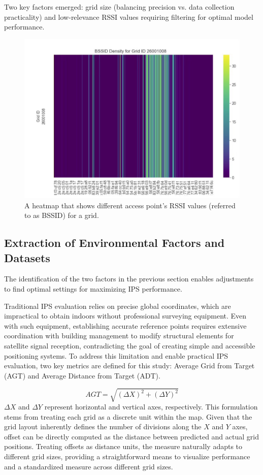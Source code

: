\documentclass[runningheads]{llncs}
\begin{document}
Two key factors emerged: grid size (balancing precision vs. data collection practicality) and low-relevance RSSI values requiring filtering for optimal model performance.

\begin{figure}[htbp]
	\centerline{\includegraphics[scale=0.15]{meth3.jpg}}
	\caption{A heatmap that shows different access point’s RSSI values (referred to as BSSID) for a grid.}
	\label{fig:heatmap008}
\end{figure}

\subsection{Extraction of Environmental Factors and Datasets}
The identification of the two factors in the previous section enables adjustments to find optimal settings for maximizing IPS performance. 

Traditional IPS evaluation relies on precise global coordinates, which are impractical to obtain indoors without professional surveying equipment. Even with such equipment, establishing accurate reference points requires extensive coordination with building management to modify structural elements for satellite signal reception, contradicting the goal of creating simple and accessible positioning systems. To address this limitation and enable practical IPS evaluation, two key metrics are defined for this study: Average Grid from Target (AGT) and Average Distance from Target (ADT).

\begin{equation}
	AGT = \sqrt{(\Delta X)^2 + (\Delta Y)^2}
	\label{eq:agt}
\end{equation}
$\Delta X$ and $\Delta Y$ represent horizontal and vertical axes, respectively. This formulation stems from treating each grid as a discrete unit within the map. Given that the grid layout inherently defines the number of divisions along the $X$ and $Y$ axes, offset can be directly computed as the distance between predicted and actual grid positions. Treating offsets as distance units, the measure naturally adapts to different grid sizes, providing a straightforward means to visualize performance and a standardized measure across different grid sizes.
\end{document}
